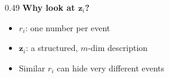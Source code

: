\begin{frame}[plain]
\begin{columns}[T,onlytextwidth]
    \begin{column}{0.49\textwidth}
      {\small\textbf{Why look at $\mathbf{z}_i$?}}\par
      \begin{itemize}
        \tightlist
        \item $r_i$: one number per event
        \item $\mathbf{z}_i$: a structured, $m$-dim description
        \item Similar $r_i$ can hide very different events
      \end{itemize}
    \end{column}
  \end{columns}

  \vspace{3.0mm}

  \slideheaderfooter
\end{frame}
